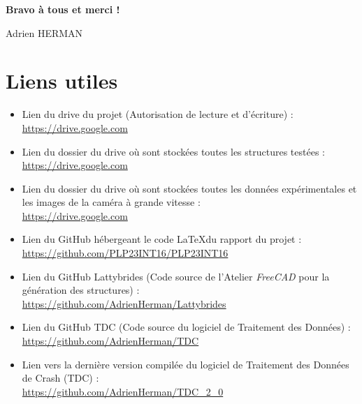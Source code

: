 \documentclass[a4paper]{article}
\begin{document}
	\begin{flushright}
		\textbf{\large Bravo à tous et merci !}
		
		Adrien HERMAN
	\end{flushright}
	
	\vspace{3cm}
	
	\section*{Liens utiles}
	\begin{itemize}
		\item Lien du drive du projet (Autorisation de lecture et d'écriture) :\\ \href{https://drive.google.com/drive/folders/1Y3JJd3HjbAqBD-ykjscEf51ELvaYXhEQ?usp=sharing}{https://drive.google.com}
		
		\item Lien du dossier du drive où sont stockées toutes les structures testées :\\
		\href{https://drive.google.com/drive/folders/1Dxy5Yaq-WHseOIPNWpTo1YhIdbHROOMq?usp=drive_link}{https://drive.google.com}
		
		\item Lien du dossier du drive où sont stockées toutes les données expérimentales et les images de la caméra à grande vitesse :\\
		\href{https://drive.google.com/drive/folders/1GixQ5m0--2UXGmWGoiHR0oR_ZuMvKeyD?usp=drive_link}{https://drive.google.com}
		
		\item Lien du GitHub hébergeant le code \LaTeX du rapport du projet :\\
		\href{https://github.com/PLP23INT16/PLP23INT16}{https://github.com/PLP23INT16/PLP23INT16}
		
		\item Lien du GitHub Lattybrides (Code source de l'Atelier \textit{FreeCAD} pour la génération des structures) :\\ \href{https://github.com/AdrienHerman/Lattybrides/tree/main}{https://github.com/AdrienHerman/Lattybrides}
		
		\item Lien du GitHub TDC (Code source du logiciel de Traitement des Données) :\\ \href{https://github.com/AdrienHerman/TDC-Traitement_des_Donnees_de_Crash}{https://github.com/AdrienHerman/TDC}
		
		\item Lien vers la dernière version compilée du logiciel de Traitement des Données de Crash (TDC) :\\ \href{https://github.com/AdrienHerman/TDC-Traitement_des_Donnees_de_Crash/releases/tag/TDC_2_2}{https://github.com/AdrienHerman/TDC\_2\_0}
		

\end{itemize}
\end{document}
